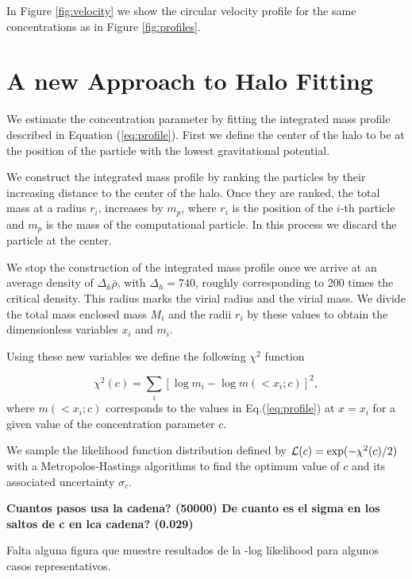 \documentclass[useAMS,usenatbib]{mn2e}
\begin{document}
In Figure \ref{fig:velocity} we show the circular velocity profile for the same
concentrations as in Figure \ref{fig:profiles}.

\section{A new Approach to Halo Fitting}
\label{sec:method}


We estimate the concentration parameter by fitting the
integrated mass profile described in Equation
(\ref{eq:profile}). First we define the center of the halo to be  at
the position of the particle with the lowest gravitational
potential. 



We construct the integrated mass profile by ranking the particles by
their increasing distance to the center of the halo. Once they are ranked,
the total mass at a radius $r_i$, increases by $m_p$, where $r_i$ is
the position of the $i$-th particle and $m_p$ is the mass of the
computational particle.  In this process we discard the
particle at the center.  


We stop the construction of the integrated mass profile once we arrive
at an average density of $\Delta_h\bar{\rho}$, with $\Delta_h=740$,
roughly corresponding to 200 times the critical density. This radius marks the
virial radius and the virial mass. We divide the total mass enclosed
mass $M_i$ and the radii $r_i$ by these values to obtain the
dimensionless variables $x_i$ and $m_i$. 

Using these new variables we define the following $\chi^2$ function

\begin{equation}
\chi^2(c) = \sum_{i}[\log m_i - \log m(< x_i;c)]^2, 
\end{equation}
%
where $m(<x_i;c)$ corresponds to the values in Eq.(\ref{eq:profile}) at
$x=x_i$ for a given value of the concentration parameter $c$. 

We sample the likelihood function distribution defined by ${\cal
  L}(c)=\exp(-\chi^2(c)/2)$ with a Metropolos-Hastings algorithms to
find the optimum value of $c$ and its  associated uncertainty
$\sigma_c$.  


{\bf Cuantos pasos usa la cadena? (50000) De cuanto es el sigma en
los saltos de c en lca cadena? (0.029)

Falta alguna figura que muestre resultados de la -log likelihood para
algunos casos representativos.
}
\end{document}
